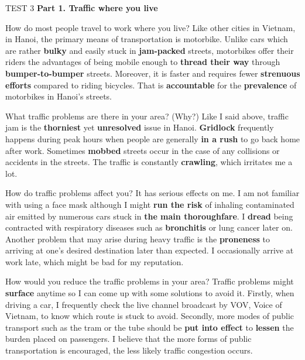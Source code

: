 \begin{glossarymc}[Cambridge 6]
    \begin{test}{TEST 3}
    \noindent
    \textbf{Part 1. Traffic where you live}
    \begin{qa}{How do most people travel to work where you live?}
    Like other cities in Vietnam, in Hanoi, the primary means of transportation is motorbike. Unlike cars which are rather \textbf{bulky} and easily stuck in \textbf{jam-packed} streets, motorbikes offer their riders the advantages of being mobile enough to \textbf{thread their way} through \textbf{bumper-to-bumper} streets. Moreover, it is faster and requires fewer \textbf{strenuous efforts} compared to riding bicycles. That is \textbf{accountable} for the \textbf{prevalence} of motorbikes in Hanoi's streets.
    \end{qa}

    \begin{qa}{What traffic problems are there in your area? (Why?)}
    Like I said above, traffic jam is the \textbf{thorniest} yet \textbf{unresolved} issue in Hanoi. \textbf{Gridlock} frequently happens during peak hours when people are generally \textbf{in a rush} to go back home after work. Sometimes \textbf{mobbed} streets occur in the case of any collisions or accidents in the streets. The traffic is constantly \textbf{crawling}, which irritates me a lot.
    \end{qa}

    \begin{qa}{How do traffic problems affect you?}
    It has serious effects on me. I am not familiar with using a face mask although I might \textbf{run the risk} of inhaling contaminated air emitted by numerous cars stuck in \textbf{the main thoroughfare}. I \textbf{dread} being contracted with respiratory diseases such as \textbf{bronchitis} or lung cancer later on. Another problem that may arise during heavy traffic is the \textbf{proneness} to arriving at one's desired destination later than expected. I occasionally arrive at work late, which might be bad for my reputation.
    \end{qa}

    \begin{qa}{How would you reduce the traffic problems in your area?}
    Traffic problems might \textbf{surface} anytime so I can come up with some solutions to avoid it. Firstly, when driving a car, I frequently check the live channel broadcast by VOV, Voice of Vietnam, to know which route is stuck to avoid. Secondly, more modes of public transport such as the tram or the tube should be \textbf{put into effect} to \textbf{lessen} the burden placed on passengers. I believe that the more forms of public transportation is encouraged, the less likely traffic congestion occurs.
    \end{qa}


\end{test}
\end{glossarymc}
